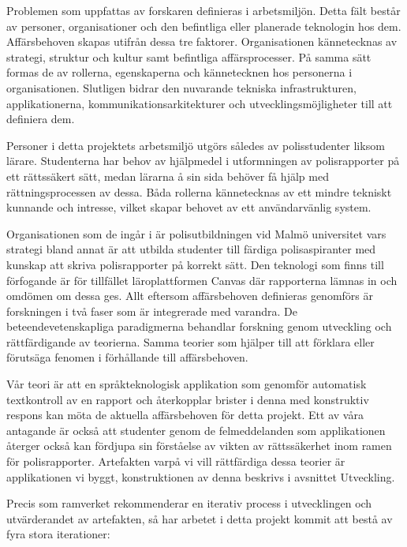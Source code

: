 \documentclass[swedish]{maucsthesis}
\begin{document}
Problemen som uppfattas av forskaren definieras i arbetsmiljön. Detta fält
består av personer, organisationer och den befintliga eller planerade teknologin
hos dem. Affärsbehoven skapas utifrån dessa tre faktorer. Organisationen
kännetecknas av strategi, struktur och kultur samt befintliga affärsprocesser.
På samma sätt formas de av rollerna, egenskaperna och kännetecknen hos
personerna i organisationen. Slutligen bidrar den nuvarande tekniska
infrastrukturen, applikationerna, kommunikationsarkitekturer och
utvecklingsmöjligheter till att definiera dem.

Personer i detta projektets arbetsmiljö utgörs således av polisstudenter liksom
lärare. Studenterna har behov av hjälpmedel i utformningen av polisrapporter på
ett rättssäkert sätt, medan lärarna å sin sida behöver få hjälp med
rättningsprocessen av dessa. Båda rollerna kännetecknas av ett mindre tekniskt
kunnande och intresse, vilket skapar behovet av ett användarvänlig system.

Organisationen som de ingår i är polisutbildningen vid Malmö universitet vars
strategi bland annat är att utbilda studenter till färdiga polisaspiranter med
kunskap att skriva polisrapporter på korrekt sätt. Den teknologi som finns till
förfogande är för tillfället läroplattformen Canvas där rapporterna lämnas in
och omdömen om dessa ges. Allt eftersom affärsbehoven definieras genomförs är
forskningen i två faser som är integrerade med varandra. De
beteendevetenskapliga paradigmerna behandlar forskning genom utveckling och
rättfärdigande av teorierna. Samma teorier som hjälper till att förklara eller
förutsäga fenomen i förhållande till affärsbehoven.

Vår teori är att en språkteknologisk applikation som genomför automatisk
textkontroll av en rapport och återkopplar brister i denna med konstruktiv
respons kan möta de aktuella affärsbehoven för detta projekt. Ett av våra
antagande är också att studenter genom de felmeddelanden som applikationen
återger också kan fördjupa sin förståelse av vikten av rättssäkerhet inom ramen
för polisrapporter. Artefakten varpå vi vill rättfärdiga dessa teorier är
applikationen vi byggt, konstruktionen av denna beskrivs i avsnittet Utveckling.

Precis som ramverket rekommenderar en iterativ process i utvecklingen och utvärderandet av artefakten, så har arbetet i detta projekt kommit att bestå av fyra stora iterationer:
\end{document}
